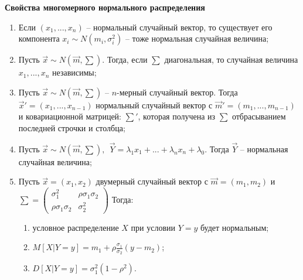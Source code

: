 \textbf{Свойства многомерного нормального распределения}
\begin{enumerate}
	\item Если $(x_1,...,x_n)$ -- нормальный случайный вектор, то существует его компонента $x_i\sim N(m_i,\sigma_i^2)$ -- тоже нормальная случайная величина;
	
	\item Пусть $\vec{x}\sim N(\vec{m},\sum)$. Тогда, если $\sum$ диагональная, то случайная величина $x_1,...,x_n$ независимы;
	
	\item Пусть $\vec{x}\sim N(\vec{m},\sum)$ -- $n$-мерный случайный вектор. Тогда $\vec{x}'=(x_1,...,x_{n-1})$ нормальный случайный вектор с $\vec{m}'=(m_1,...,m_{n-1})$ и ковариационной матрицей:
	$\sum'$, которая получена из $\sum$ отбрасыванием последней строчки и столбца;
	
	\item Пусть $\vec{x}\sim N(\vec{m},\sum), ~~ \vec{Y}=\lambda_1x_1+...+\lambda_n x_n+\lambda_0$. Тогда $\vec{Y}$ -- нормальная случайная величина;
	
	\item Пусть $\vec{x}=(x_1,x_2)$ двумерный случайный вектор с $\vec{m}=(m_1,m_2)$ и $\sum = 
	\begin{pmatrix}
		\sigma_1^2 & \rho\sigma_1\sigma_2 \\
		\rho\sigma_1\sigma_2 & \sigma_2^2
	\end{pmatrix}$ Тогда:
	\begin{enumerate}
	\item условное распределение $X$ при условии $Y=y$ будет нормальным;
	\item $M[X|Y=y]=m_1+\rho\tfrac{\sigma_1}{\sigma_2}(y-m_2)$;
	\item $D[X|Y=y]=\sigma_1^2(1-\rho^2)$.
	\end{enumerate}
\end{enumerate}

